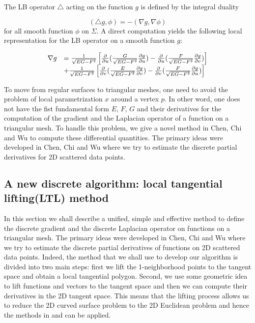 \documentclass{elsart}
\begin{document}
    The LB operator $\triangle$ acting on the function $g$ is defined by the
integral duality

\begin{equation}
( \triangle g, \phi ) = - ( \nabla g, \nabla \phi)
\end{equation}
for all smooth function $\phi$ on $\Sigma$. A direct computation
yields the following local representation for the LB operator on a
smooth function $g$:

\begin{equation}
\begin{array}{ll}
\nabla g & = \frac{1}{\sqrt{EG-F^2}}\left [ \frac{\partial}{\partial
u}(\frac{G}{\sqrt{EG-F^2}}\frac{\partial g}{\partial u}) -
\frac{\partial }{\partial u}(\frac{F}{\sqrt{EG-F^2}}\frac{\partial
g}{\partial v}) \right ] \cr
 & +\frac{1}{\sqrt{EG-F^2}}\left [ \frac{\partial}{\partial
v}(\frac{E}{\sqrt{EG-F^2}}\frac{\partial g}{\partial v}) -
\frac{\partial }{\partial v}(\frac{F}{\sqrt{EG-F^2}}\frac{\partial
g}{\partial u}) \right ]
\end{array}
\end{equation}



To move from regular surfaces to triangular meshes, one need to
avoid the problem of local parametrization $x$ around a vertex $p$.
In other word, one does not have the fist fundamental form $E$, $F$,
$G$ and their derivatives for the computation of the gradient and
the Laplacian operator of a function on a triangular mesh. To handle
this problem, we give a novel method in Chen, Chi and Wu\cite{Chen5}
to compute these differential quantities. The primary ideas were
developed in Chen, Chi and Wu\cite{Chen4} where we try to estimate
the discrete partial derivatives for 2D scattered data points.


\subsection{ A new discrete algorithm: local tangential lifting(LTL) method}

In this section we shall describe a unified, simple and effective
method to define the discrete gradient and the discrete Laplacian
operator on functions on a triangular mesh. The primary ideas were
developed in Chen, Chi and Wu\cite{Chen3,Chen4} where we try to
estimate the discrete partial derivatives of functions on 2D
scattered data points. Indeed, the method that we shall use to
develop our algorithm is divided into two main steps: first we lift
the 1-neighborhood points to the tangent space and obtain a local
tangential polygon. Second, we use some geometric idea to lift
functions and vectors to the tangent space and then we can compute
their derivatives in the 2D tangent space. This means that the
lifting process allows us to reduce the 2D curved surface problem to
the 2D Euclidean problem and hence the methods in \cite{Chen4}
and\cite{Hiroshi} can be applied.
\end{document}
